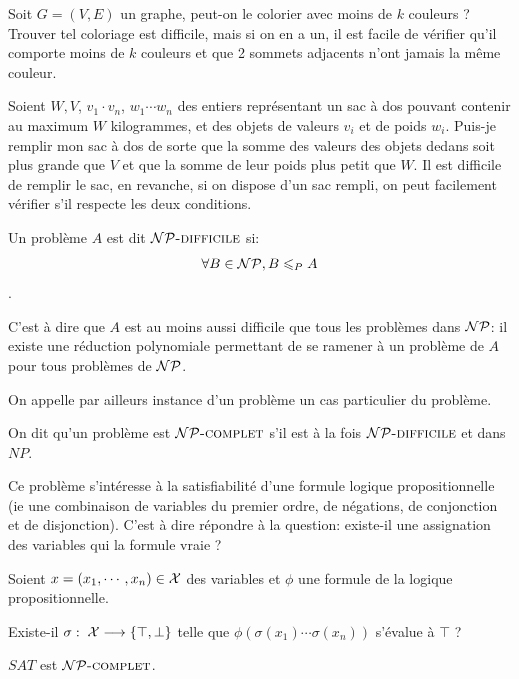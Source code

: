 \documentclass{standalone}
\begin{document}
\begin{exemple}
	Soit $G=(V,E)$ un graphe, peut-on le colorier avec moins de $k$ couleurs ? Trouver tel coloriage est difficile, mais si on en a un, il est facile de vérifier qu'il comporte moins de $k$ couleurs et que 2 sommets adjacents n'ont jamais la même couleur.
	
	Soient $W, V$, $v_1 \cdot v_n$, $w_1 \cdots w_n$ des entiers représentant un sac à dos pouvant contenir au maximum $W$ kilogrammes, et des objets de valeurs $v_i$ et de poids $w_i$. Puis-je remplir mon sac à dos de sorte que la somme des valeurs des objets dedans soit plus grande que $V$ et que la somme de leur poids plus petit que $W$. Il est difficile de remplir le sac, en revanche, si on dispose d'un sac rempli, on peut facilement vérifier s'il respecte les deux conditions.
\end{exemple}

\begin{defn}
	Un problème $A$ est dit $\mathcal{NP}\text{\textsc{-difficile}}$ si:
	\[\forall B \in \mathcal{NP}, B \leqslant_P A\].
	
	C'est à dire que $A$ est au moins aussi difficile que tous les problèmes dans $\mathcal{NP}$: il existe une réduction polynomiale permettant de se ramener à un problème de $A$ pour tous problèmes de $\mathcal{NP}$.
	
	On appelle par ailleurs instance d'un problème un cas particulier du problème.
\end{defn}

\begin{defn}[$\NPCOMPLETE$]
	On dit qu'un problème est $\NPCOMPLETE$ s'il est à la fois $\mathcal{NP}\text{\textsc{-difficile}}$ et dans $NP$.
\end{defn}

\begin{defn}
	Ce problème s'intéresse à la satisfiabilité d'une formule logique propositionnelle (ie une combinaison de variables du premier ordre, de négations, de conjonction et de disjonction). C'est à dire répondre à la question: existe-il une assignation des variables qui la formule vraie ?
	
	Soient $x = (x_1, \cdots, x_n) \in \mathcal X$ des variables et $\phi$ une formule de la logique propositionnelle.
	
	Existe-il $\sigma:\; \mathcal X \longrightarrow \left\{ \top, \bot\right\}$ telle que $\phi(\sigma(x_1) \cdots \sigma(x_n))$ s'évalue à $\top$ ?
\end{defn}

\begin{thm}
	$SAT$ est $\NPCOMPLETE$.
\end{thm}
\end{document}
